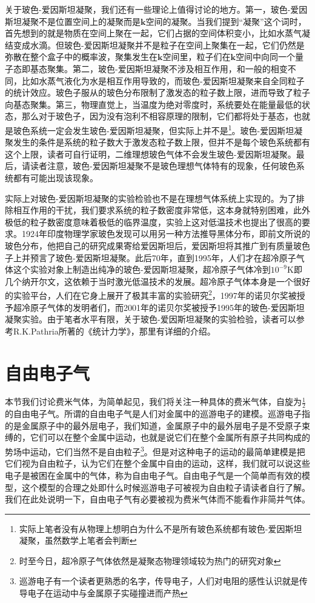 \documentclass[../../main.tex]{subfiles}
\begin{document}
关于玻色-爱因斯坦凝聚，我们还有一些理论上值得讨论的地方。第一，玻色-爱因斯坦凝聚不是位置空间上的凝聚而是\(\bm{k}\)空间的凝聚。当我们提到“凝聚”这个词时，首先想到的就是物质在空间上聚在一起，它们占据的空间体积变小，比如水蒸气凝结变成水滴。但玻色-爱因斯坦凝聚并不是粒子在空间上聚集在一起，它们仍然是弥散在整个盒子中的概率波，聚集发生在\(\bm{k}\)空间里，粒子们在\(\bm{k}\)空间中向同一个量子态即基态聚集。第二，玻色-爱因斯坦凝聚不涉及相互作用，和一般的相变不同，比如水蒸气液化为水是相互作用导致的，而玻色-爱因斯坦凝聚来自全同粒子的统计效应。玻色子服从的玻色分布限制了激发态的粒子数上限，进而导致了粒子向基态聚集。第三，物理直觉上，当温度为绝对零度时，系统要处在能量最低的状态，那么对于玻色子，因为没有泡利不相容原理的限制，它们都将处于基态，也就是玻色系统一定会发生玻色-爱因斯坦凝聚，但实际上并不是\footnote{实际上笔者没有从物理上想明白为什么不是所有玻色系统都有玻色-爱因斯坦凝聚，虽然数学上笔者会判断}。玻色-爱因斯坦凝聚发生的条件是系统的粒子数大于激发态粒子数上限，但并不是每个玻色系统都有这个上限，读者可自行证明，二维理想玻色气体不会发生玻色-爱因斯坦凝聚。最后，请读者注意，玻色-爱因斯坦凝聚不是玻色理想气体特有的现象，任何玻色系统都有可能出现该现象。

实际上对玻色-爱因斯坦凝聚的实验检验也不是在理想气体系统上实现的。为了排除相互作用的干扰，我们要求系统的粒子数密度非常低，这本身就特别困难，此外极低的粒子数密度意味着极低的临界温度，实验上这对低温技术也提出了很高的要求。1924年印度物理学家玻色发现可以用另一种方法推导黑体分布，即前文所说的玻色分布，他把自己的研究成果寄给爱因斯坦后，爱因斯坦将其推广到有质量玻色子上并预言了玻色-爱因斯坦凝聚。此后70年，直到1995年，人们才在超冷原子气体这个实验对象上制造出纯净的玻色-爱因斯坦凝聚，超冷原子气体冷到\(10^{-9}\mathrm{K}\)即几个纳开尔文，这依赖于当时激光低温技术的发展。超冷原子气体本身是一个很好的实验平台，人们在它身上展开了极其丰富的实验研究\footnote{时至今日，超冷原子气体依然是凝聚态物理领域较为热门的研究对象}，1997年的诺贝尔奖被授予超冷原子气体的发明者们，而2001年的诺贝尔奖被授予1995年的玻色-爱因斯坦凝聚实验。由于笔者水平有限，关于玻色-爱因斯坦凝聚的实验检验，读者可以参考R.K.Pathria所著的《统计力学》，那里有详细的介绍。

\section{自由电子气}

本节我们讨论费米气体，为简单起见，我们将关注一种具体的费米气体，自旋为\(\frac{1}{2}\)的自由电子气。所谓的自由电子气是人们对金属中的巡游电子的建模。巡游电子指的是金属原子中的最外层电子，我们知道，金属原子中的最外层电子是不受原子束缚的，它们可以在整个金属中运动，也就是说它们在整个金属所有原子共同构成的势场中运动，它们当然不是自由粒子\footnote{巡游电子有一个读者更熟悉的名字，传导电子，人们对电阻的感性认识就是传导电子在运动中与金属原子实碰撞进而产热}。但是对这种电子的运动的最简单建模是把它们视为自由粒子，认为它们在整个金属中自由的运动，这样，我们就可以说这些电子是被困在金属中的气体，称为自由电子气。自由电子气是一个简单而有效的模型，这个模型的合理之处即什么时候巡游电子可被视为自由粒子请读者自行了解。我们在此处说明一下，自由电子气有必要被视为费米气体而不能看作非简并气体。
\end{document}
